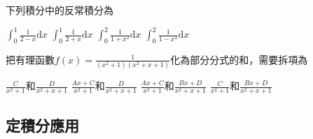 \documentclass[12pt, addpoints]{exam}
\def \important{\textbf{（重點）}}
\def \unimportant{\textit{（非重點）}}
\def \d{\mathrm{d}}
\begin{document}
\begin{questions}

\question[1]
下列積分中的反常積分為
\begin{choices}
    \choice $\displaystyle \int_0^1 \frac{1}{2-x} \d x$
    \choice $\displaystyle \int_0^1 \frac{1}{2+x} \d x$
    \choice $\displaystyle \int_0^2 \frac{1}{1+x^2} \d x$
    \choice $\displaystyle \int_0^2 \frac{1}{1-x^2} \d x$
\end{choices}

\question[1]
把有理函數$\displaystyle f(x)=\frac{1}{(x^2+1)(x^2+x+1)}$化為部分分式的和，需要拆項為
\begin{choices}
    \choice $\displaystyle \frac{C}{x^2+1}$和$\displaystyle \frac{D}{x^2+x+1}$
    \choice $\displaystyle \frac{Ax+C}{x^2+1}$和$\displaystyle \frac{D}{x^2+x+1}$
    \choice $\displaystyle \frac{Ax+C}{x^2+1}$和$\displaystyle \frac{Bx+D}{x^2+x+1}$
    \choice $\displaystyle \frac{C}{x^2+1}$和$\displaystyle \frac{Bx+D}{x^2+x+1}$
\end{choices}

\end{questions}

\newpage %

\subsection{定積分應用}
\end{document}
